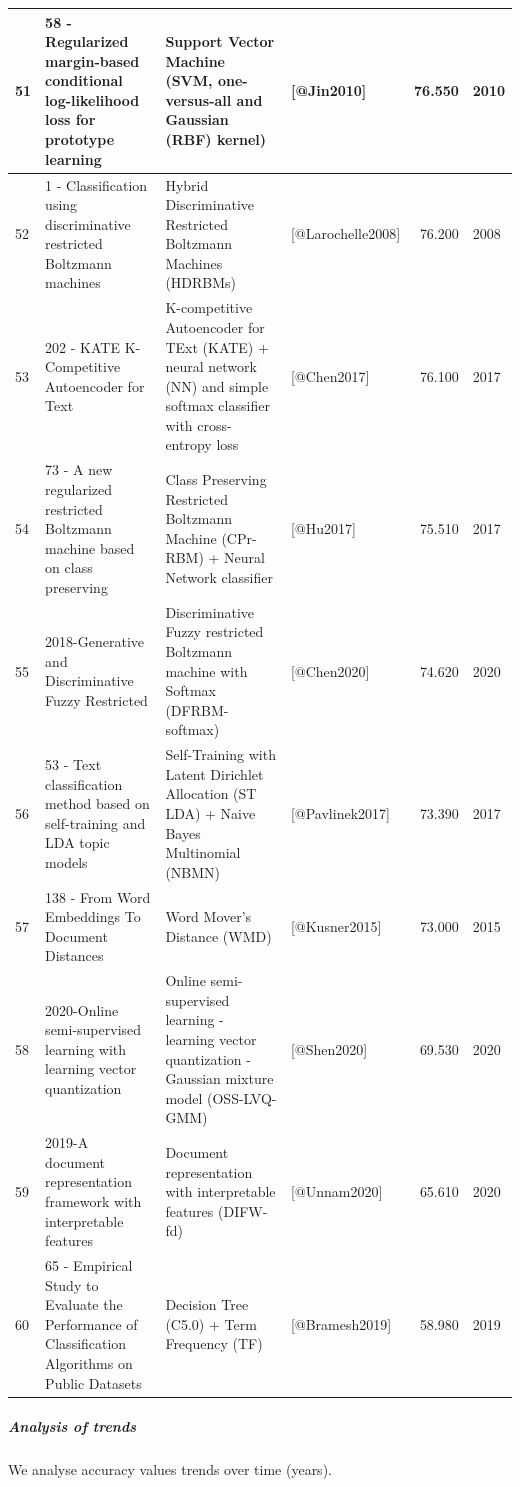 \documentclass[
]{article}
\begin{document}
\begin{table}
\begin{tabular}[t]{l|l|l|l|r|l}
\hline
51 & 58 - Regularized margin-based conditional log-likelihood loss for prototype learning & Support Vector Machine (SVM, one-versus-all and Gaussian (RBF) kernel) & [@Jin2010] & 76.550 & 2010\\
\hline
52 & 1 - Classification using discriminative restricted Boltzmann machines & Hybrid Discriminative Restricted Boltzmann Machines (HDRBMs) & [@Larochelle2008] & 76.200 & 2008\\
\hline
53 & 202 - KATE K-Competitive Autoencoder for Text & K-competitive Autoencoder for TExt (KATE) + neural network (NN) and simple softmax classifier with cross-entropy loss & [@Chen2017] & 76.100 & 2017\\
\hline
54 & 73 - A new regularized restricted Boltzmann machine based on class preserving & Class Preserving  Restricted Boltzmann Machine (CPr-RBM) + Neural Network classifier & [@Hu2017] & 75.510 & 2017\\
\hline
55 & 2018-Generative and Discriminative Fuzzy Restricted & Discriminative Fuzzy restricted Boltzmann machine with Softmax (DFRBM-softmax) & [@Chen2020] & 74.620 & 2020\\
\hline
56 & 53 - Text classification method based on self-training and LDA topic models & Self-Training with Latent Dirichlet Allocation (ST LDA) + Naive Bayes Multinomial (NBMN) & [@Pavlinek2017] & 73.390 & 2017\\
\hline
57 & 138 - From Word Embeddings To Document Distances & Word Mover's Distance (WMD) & [@Kusner2015] & 73.000 & 2015\\
\hline
58 & 2020-Online semi-supervised learning with learning vector quantization & Online semi-supervised learning - learning vector quantization - Gaussian mixture model (OSS-LVQ-GMM) & [@Shen2020] & 69.530 & 2020\\
\hline
59 & 2019-A document representation framework with interpretable features & Document representation with interpretable features (DIFW-fd) & [@Unnam2020] & 65.610 & 2020\\
\hline
60 & 65 - Empirical Study to Evaluate the Performance of Classification Algorithms on Public Datasets & Decision Tree (C5.0) +  Term Frequency (TF) & [@Bramesh2019] & 58.980 & 2019\\
\hline
\end{tabular}
\end{table}

\hypertarget{analysis-of-trends}{%
\subparagraph{Analysis of trends}\label{analysis-of-trends}}

We analyse accuracy values trends over time (years).
\end{document}

